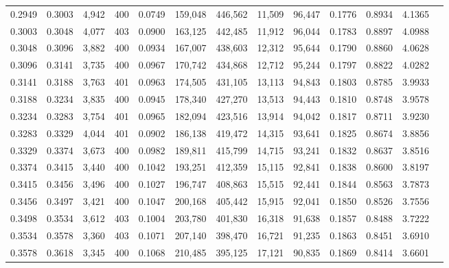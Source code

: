 \begin{tabular}{rrrrrrrrrrrrr}
0.2949 & 0.3003 & 4,942 & 400 &                                     0.0749 & 159,048 & 446,562 &  11,509 &  96,447 & 0.1776 & 0.8934 & 4.1365 \\
0.3003 & 0.3048 & 4,077 & 403 &                                     0.0900 & 163,125 & 442,485 &  11,912 &  96,044 & 0.1783 & 0.8897 & 4.0988 \\
0.3048 & 0.3096 & 3,882 & 400 &                                     0.0934 & 167,007 & 438,603 &  12,312 &  95,644 & 0.1790 & 0.8860 & 4.0628 \\
0.3096 & 0.3141 & 3,735 & 400 &                                     0.0967 & 170,742 & 434,868 &  12,712 &  95,244 & 0.1797 & 0.8822 & 4.0282 \\
0.3141 & 0.3188 & 3,763 & 401 &                                     0.0963 & 174,505 & 431,105 &  13,113 &  94,843 & 0.1803 & 0.8785 & 3.9933 \\
0.3188 & 0.3234 & 3,835 & 400 &                                     0.0945 & 178,340 & 427,270 &  13,513 &  94,443 & 0.1810 & 0.8748 & 3.9578 \\
0.3234 & 0.3283 & 3,754 & 401 &                                     0.0965 & 182,094 & 423,516 &  13,914 &  94,042 & 0.1817 & 0.8711 & 3.9230 \\
0.3283 & 0.3329 & 4,044 & 401 &                                     0.0902 & 186,138 & 419,472 &  14,315 &  93,641 & 0.1825 & 0.8674 & 3.8856 \\
0.3329 & 0.3374 & 3,673 & 400 &                                     0.0982 & 189,811 & 415,799 &  14,715 &  93,241 & 0.1832 & 0.8637 & 3.8516 \\
0.3374 & 0.3415 & 3,440 & 400 &                                     0.1042 & 193,251 & 412,359 &  15,115 &  92,841 & 0.1838 & 0.8600 & 3.8197 \\
0.3415 & 0.3456 & 3,496 & 400 &                                     0.1027 & 196,747 & 408,863 &  15,515 &  92,441 & 0.1844 & 0.8563 & 3.7873 \\
0.3456 & 0.3497 & 3,421 & 400 &                                     0.1047 & 200,168 & 405,442 &  15,915 &  92,041 & 0.1850 & 0.8526 & 3.7556 \\
0.3498 & 0.3534 & 3,612 & 403 &                                     0.1004 & 203,780 & 401,830 &  16,318 &  91,638 & 0.1857 & 0.8488 & 3.7222 \\
0.3534 & 0.3578 & 3,360 & 403 &                                     0.1071 & 207,140 & 398,470 &  16,721 &  91,235 & 0.1863 & 0.8451 & 3.6910 \\
0.3578 & 0.3618 & 3,345 & 400 &                                     0.1068 & 210,485 & 395,125 &  17,121 &  90,835 & 0.1869 & 0.8414 & 3.6601 \\

\end{tabular}
